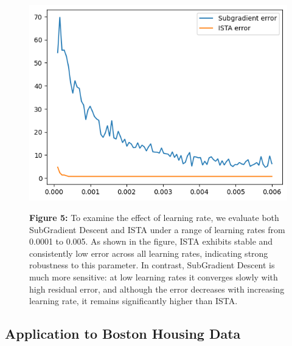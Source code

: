 \documentclass[11pt]{article}
\begin{document}
\begin{figure}[H]
    \centering
    \begin{minipage}{0.3\textwidth}
        \includegraphics[width=\linewidth]{figures/fig7.png}
    \end{minipage}
    \hfill
    \begin{minipage}{0.5\textwidth}
        \small
        \textbf{Figure 5:}
        To examine the effect of learning rate, we evaluate both SubGradient Descent and ISTA under a range of learning rates from 0.0001 to 0.005.
        As shown in the figure, ISTA exhibits stable and consistently low error across all learning rates, indicating strong robustness to this parameter. In contrast, SubGradient Descent is much more sensitive: at low learning rates it converges slowly with high residual error, and although the error decreases with increasing learning rate, it remains significantly higher than ISTA.
    \end{minipage}
\end{figure}

\subsection{Application to Boston Housing Data}
\end{document}
